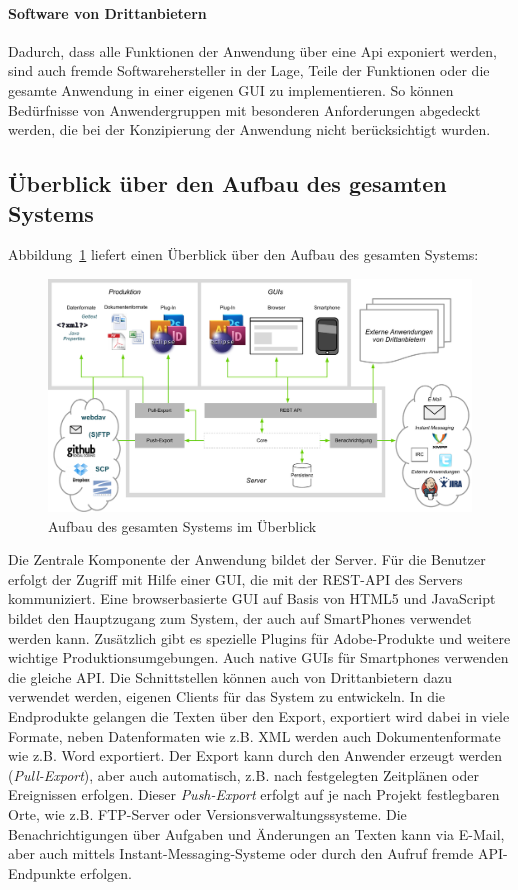 \paragraph{Software von Drittanbietern} Dadurch, dass alle Funktionen der Anwendung über eine Api exponiert werden, sind auch fremde Softwarehersteller in der Lage, Teile der Funktionen oder die gesamte Anwendung in einer eigenen GUI zu implementieren. So können Bedürfnisse von Anwendergruppen mit besonderen Anforderungen abgedeckt werden, die bei der Konzipierung der Anwendung nicht berücksichtigt wurden.

\subsection{Überblick über den Aufbau des gesamten Systems}

Abbildung~\ref{chart:gesamtessystem} liefert einen Überblick über den Aufbau des gesamten Systems:

\begin{figure}[htb]
\begin{center}
\includegraphics[width=\textwidth]{media/GesamtesSystem.pdf}
\caption{Aufbau des gesamten Systems im Überblick}
\label{chart:gesamtessystem}
\end{center}
\end{figure}

Die Zentrale Komponente der Anwendung bildet der Server. Für die Benutzer erfolgt der Zugriff mit Hilfe einer GUI, die mit der REST-API des Servers kommuniziert. Eine browserbasierte GUI auf Basis von HTML5 und JavaScript bildet den Hauptzugang zum System, der auch auf SmartPhones verwendet werden kann. Zusätzlich gibt es spezielle Plugins für Adobe-Produkte und weitere wichtige Produktionsumgebungen. Auch native GUIs für Smartphones verwenden die gleiche API. Die Schnittstellen können auch von Drittanbietern dazu verwendet werden, eigenen Clients für das System zu entwickeln. In die Endprodukte gelangen die Texten über den Export, exportiert wird dabei in viele Formate, neben Datenformaten wie z.B. XML werden auch Dokumentenformate wie z.B. Word exportiert. Der Export kann durch den Anwender erzeugt werden (\emph{Pull-Export}), aber auch automatisch, z.B. nach festgelegten Zeitplänen oder Ereignissen erfolgen. Dieser \emph{Push-Export} erfolgt auf je nach Projekt festlegbaren Orte, wie z.B. FTP-Server oder Versionsverwaltungssysteme. Die Benachrichtigungen über Aufgaben und Änderungen an Texten kann via E-Mail, aber auch mittels Instant-Messaging-Systeme oder durch den Aufruf fremde API-Endpunkte erfolgen.